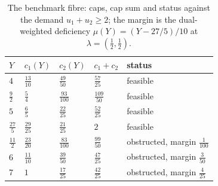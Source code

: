 \begin{table}[H]
\centering\small
\caption{The benchmark fibre: caps, cap sum and status against the demand $u_1+u_2\ge 2$; the margin is the dual-weighted deficiency $\mu(Y)=(Y-27/5)/10$ at $\lambda=(\tfrac12,\tfrac12)$.}
\label{tab:bench}
\begin{tabular}{lllll}
\toprule
$Y$ & $c_1(Y)$ & $c_2(Y)$ & $c_1+c_2$ & status \\
\midrule
$4$ & $\tfrac{13}{10}$ & $\tfrac{49}{50}$ & $\tfrac{57}{25}$ & feasible \\
$\tfrac{9}{2}$ & $\tfrac{5}{4}$ & $\tfrac{93}{100}$ & $\tfrac{109}{50}$ & feasible \\
$5$ & $\tfrac{6}{5}$ & $\tfrac{22}{25}$ & $\tfrac{52}{25}$ & feasible \\
$\tfrac{27}{5}$ & $\tfrac{29}{25}$ & $\tfrac{21}{25}$ & $2$ & feasible \\
$\tfrac{11}{2}$ & $\tfrac{23}{20}$ & $\tfrac{83}{100}$ & $\tfrac{99}{50}$ & obstructed, margin $\tfrac{1}{100}$ \\
$6$ & $\tfrac{11}{10}$ & $\tfrac{39}{50}$ & $\tfrac{47}{25}$ & obstructed, margin $\tfrac{3}{50}$ \\
$7$ & $1$ & $\tfrac{17}{25}$ & $\tfrac{42}{25}$ & obstructed, margin $\tfrac{4}{25}$ \\
\bottomrule
\end{tabular}
\end{table}
